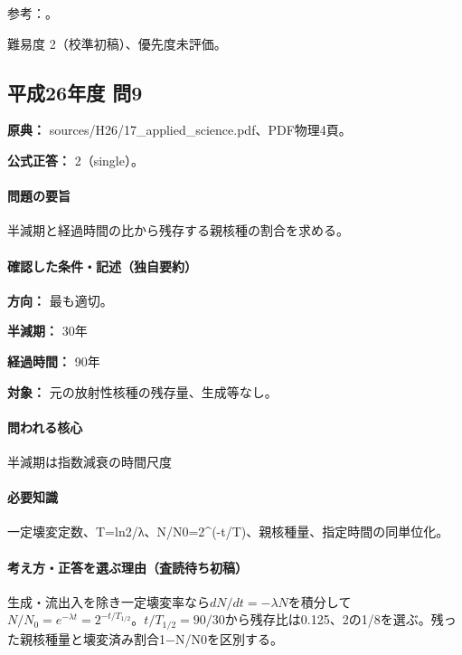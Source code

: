 \par 参考：\cite{modern_mit_nuclear,modern_mit_mass,modern_doublebeta,modern_fastfission,modern_alpha,modern_series}。

\par 難易度 2（校準初稿）、優先度未評価。

\subsection{平成26年度 問9}
\label{q:h26-reg-applied-09}

\noindent\textbf{原典：} sources/H26/17\_applied\_science.pdf、PDF物理4頁。

\textbf{公式正答：} 2（single）。

\paragraph{問題の要旨} 半減期と経過時間の比から残存する親核種の割合を求める。

\paragraph{確認した条件・記述（独自要約）}\mbox{}\par

\noindent\textbf{方向：} 最も適切。\par

\noindent\textbf{半減期：} 30年\par

\noindent\textbf{経過時間：} 90年\par

\noindent\textbf{対象：} 元の放射性核種の残存量、生成等なし。\par

\paragraph{問われる核心} 半減期は指数減衰の時間尺度

\paragraph{必要知識} 一定壊変定数、T=\allowbreak{}ln2/λ、N/N0=\allowbreak{}2\textasciicircum{}(-t/T)、親核種量、指定時間の同単位化。

\paragraph{考え方・正答を選ぶ理由（査読待ち初稿）} 生成・流出入を除き一定壊変率なら\(dN/dt=-\lambda N\)を積分して\(N/N_0=e^{-\lambda t}=2^{-t/T_{1/2}}\)。\(t/T_{1/2}=90/30\)から残存比は0.125、2の1/8を選ぶ。残った親核種量と壊変済み割合1−N/N0を区別する。

